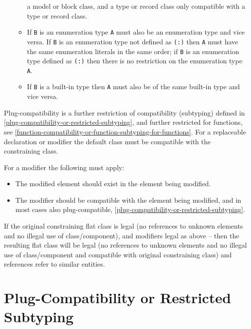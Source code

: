 \begin{itemize}
\begin{itemize}
    a model or block class, and a type or record class only compatible
    with a type or record class.
  \item
    If \lstinline!B! is an enumeration type \lstinline!A! must also be an enumeration type and
    vice versa. If \lstinline!B! is an enumeration type not defined as \lstinline!(:)! then \lstinline!A!
    must have the same enumeration literals in the same order; if \lstinline!B! is
    an enumeration type defined as \lstinline!(:)! then there is no restriction on
    the enumeration type \lstinline!A!.
  \item
    If \lstinline!B! is a built-in type then \lstinline!A! must also be of the same built-in
    type and vice versa.
  \end{itemize}
\end{itemize}

Plug-compatibility is a further restriction of compatibility (subtyping)
defined in \autoref{plug-compatibility-or-restricted-subtyping}, and further restricted for functions, see
\autoref{function-compatibility-or-function-subtyping-for-functions}. For a replaceable declaration or modifier the default class
must be compatible with the constraining class.

For a modifier the following must apply:
\begin{itemize}
\item
  The modified element should exist in the element being modified.
\item
  The modifier should be compatible with the element being modified, and
  in most cases also plug-compatible, \autoref{plug-compatibility-or-restricted-subtyping}.
\end{itemize}

\begin{nonnormative}
If the original constraining flat class is legal (no references
to unknown elements and no illegal use of class/component), and
modifiers legal as above -- then the resulting flat class will be legal
(no references to unknown elements and no illegal use of class/component
and compatible with original constraining class) and references refer to
similar entities.
\end{nonnormative}

\section{Plug-Compatibility or Restricted Subtyping}


